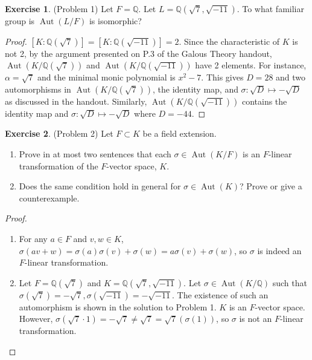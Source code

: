 \documentclass[12pt, psamsfonts]{amsart}
\theoremstyle{definition}
\newtheorem*{exer}{Exercise}
\theoremstyle{remark}
\DeclareMathOperator{\Aut}{Aut}
\numberwithin{equation}{section}
\begin{document}
\begin{exer}{(Problem 1)}
  Let $F = \mathbb{Q}$.
  Let $L = \mathbb{Q}(\sqrt{7}, \sqrt{-11})$.
  To what familiar group is $\Aut(L/F)$ is isomorphic?
\end{exer}

\begin{proof}
  $[K:\mathbb{Q}(\sqrt{7})] = [K:\mathbb{Q}(\sqrt{-11})] = 2$.
  Since the characteristic of $K$ is not 2, by the argument presented on P.3 of the Galous Theory handout, $\Aut(K/\mathbb{Q}(\sqrt{7}))$ and $\Aut(K/\mathbb{Q}(\sqrt{-11}))$ have 2 elements.
  For instance, $\alpha = \sqrt{7}$ and the minimal monic polynomial is $x^2 - 7$.
  This gives $D = 28$ and two automorphisms in $\Aut(K/\mathbb{Q}(\sqrt{7}))$, the identity map, and $\sigma: \sqrt{D} \mapsto -\sqrt{D}$ as discussed in the handout.
  Similarly, $\Aut(K/\mathbb{Q}(\sqrt{-11}))$ contains the identity map and $\sigma: \sqrt{D} \mapsto -\sqrt{D}$ where $D = -44$.
\end{proof}

\begin{exer}{(Problem 2)}
  Let $F \subset K$ be a field extension.
  \begin{enumerate}
    \item 
      Prove in at most two sentences that each $\sigma \in \Aut(K / F)$ is an $F$-linear transformation of the $F$-vector space, $K$.
    \item
      Does the same condition hold in general for $\sigma \in \Aut(K)$?
      Prove or give a counterexample.
  \end{enumerate}
\end{exer}

\begin{proof}
  $ $
  \begin{enumerate}
    \item 
      For any $a \in F$ and $v, w \in K$, $\sigma(av + w) = \sigma(a)\sigma(v) + \sigma(w) = a\sigma(v) + \sigma(w)$, so $\sigma$ is indeed an $F$-linear transformation.
    \item
      Let $F = \mathbb{Q}(\sqrt{7})$ and $K = \mathbb{Q}(\sqrt{7}, \sqrt{-11})$.
      Let $\sigma \in \Aut(K / \mathbb{Q})$ such that $\sigma(\sqrt{7}) = -\sqrt{7}, \sigma(\sqrt{-11}) = -\sqrt{-11}$.
      The existence of such an automorphism is shown in the solution to Problem 1.
      $K$ is an $F$-vector space.
      However, $\sigma(\sqrt{7} \cdot 1) = -\sqrt{7} \ne \sqrt{7} = \sqrt{7}(\sigma(1))$, so $\sigma$ is not an $F$-linear transformation.
  \end{enumerate}
\end{proof}
\end{document}

